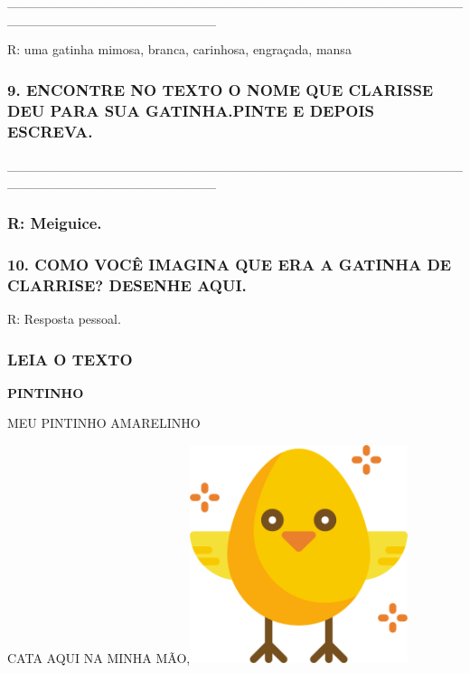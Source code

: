 \_\_\_\_\_\_\_\_\_\_\_\_\_\_\_\_\_\_\_\_\_\_\_\_\_\_\_\_\_\_\_\_\_\_\_\_\_\_\_\_\_\_\_\_\_\_\_\_\_\_\_\_\_\_\_\_\_\_\_\_\_\_\_\_\_\_\_\_\_\_

R: uma gatinha mimosa, branca, carinhosa, engraçada, mansa

\subsubsection{9. ENCONTRE NO TEXTO O NOME QUE CLARISSE DEU PARA SUA
GATINHA.PINTE E DEPOIS
ESCREVA.}\label{encontre-no-texto-o-nome-que-clarisse-deu-para-sua-gatinha.pinte-e-depois-escreva.}

\_\_\_\_\_\_\_\_\_\_\_\_\_\_\_\_\_\_\_\_\_\_\_\_\_\_\_\_\_\_\_\_\_\_\_\_\_\_\_\_\_\_\_\_\_\_\_\_\_\_\_\_\_\_\_\_\_\_\_\_\_\_\_\_\_\_\_\_\_\_

\subsubsection{R: Meiguice.}\label{r-meiguice.}

\subsubsection{10. COMO VOCÊ IMAGINA QUE ERA A GATINHA DE CLARRISE?
DESENHE
AQUI.}\label{como-vocuxea-imagina-que-era-a-gatinha-de-clarrise-desenhe-aqui.}

R: Resposta pessoal.

\subsubsection{LEIA O TEXTO}\label{leia-o-texto}

\textbf{PINTINHO}

MEU PINTINHO AMARELINHO

CATA AQUI NA MINHA
MÃO,\includegraphics[width=2.51042in,height=2.51042in]{media/image129.png}

